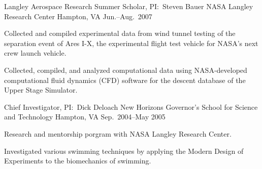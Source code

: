 \begin{cventries}
 \cventry%
   {Langley Aerospace Research Summer Scholar, PI:\ Steven Bauer}
   {NASA Langley Research Center}
   {Hampton, VA}
   {Jun.--Aug.\ 2007}
   {
     \begin{cvitems}
       \item{Collected and compiled experimental data from wind tunnel testing of the separation event of Ares I-X, the experimental flight test vehicle for NASA's next crew launch vehicle.}
       \item{Collected, compiled, and analyzed computational data using NASA-developed computational fluid dynamics (CFD) software for the descent database of the Upper Stage Simulator.}
     \end{cvitems}
   }

 \cventry%
   {Chief Investigator, PI:\ Dick Deloach}
   {New Horizons Governor's School for Science and Technology}
   {Hampton, VA}
   {Sep.\ 2004--May 2005}
   {
     \begin{cvitems}
       \item{Research and mentorship porgram with NASA Langley Research Center.}
       \item{Investigated various swimming techniques by applying the Modern Design of Experiments to the biomechanics of swimming.}
     \end{cvitems}
   }
\end{cventries}

